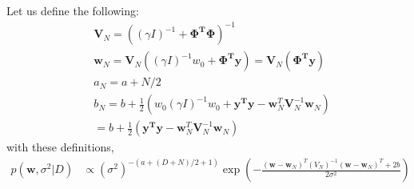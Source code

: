 \documentclass{article}
\begin{document}
Let us define the following:
\begin{equation}
\begin{aligned}
& \mathbf{V}_{N} = ((\gamma I)^{-1} + \mathbf{\Phi^{T}\Phi} )^{-1} \\
& \mathbf{w}_{N} = \mathbf{V}_{N} ((\gamma I)^{-1} w_{0} + \mathbf{\Phi^{T}y})  =\mathbf{V}_{N} ( \mathbf{\Phi^{T}y}) \\
& a_{N} = a + N/2 \\
& b_{N} = b + \frac{1}{2} (w_{0}(\gamma I)^{-1}w_{0} + \mathbf{y^{T}y} - \mathbf{w}_{N}^{T} \mathbf{V}_{N} ^{-1} \mathbf{w}_{N}) \\ 
& = b + \frac{1}{2} ( \mathbf{y^{T}y} - \mathbf{w}_{N}^{T} \mathbf{V}_{N} ^{-1} \mathbf{w}_{N})
\end{aligned}
\end{equation}
with these definitions,
\begin{equation}
\begin{aligned}
    p(\mathbf{w},\sigma^2|D) &   \propto (\sigma^2)^{-(a+(D+N)/2+1)} \exp \left( -\frac{(\mathbf{w} - \mathbf{w}_{N})^{T}(V_{N})^{-1} (\mathbf{w} - \mathbf{w}_{N})^{T}+2b}{2\sigma^2}\right)
\end{aligned}
\end{equation}
\end{document}

